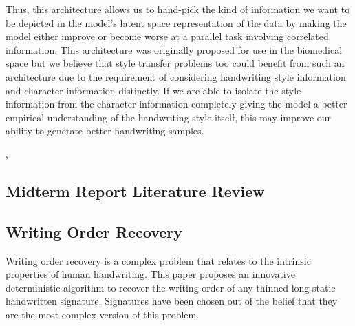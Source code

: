 \documentclass[10pt,twocolumn,letterpaper]{article}
\begin{document}
Thus, this architecture allows us to hand-pick the kind of information we want to be depicted in the model's latent space representation of the data by making the model either improve or become worse at a parallel task involving correlated information. This architecture was originally proposed for use in the biomedical space but we believe that style transfer problems too could benefit from such an architecture due to the requirement of considering handwriting style information and character information distinctly. If we are able to isolate the style information from the character information completely giving the model a better empirical understanding of the handwriting style itself, this may improve our ability to generate better handwriting samples.

,\vspace*{-1em}

\subsection*{Midterm Report Literature Review}
\subsection{Writing Order Recovery\cite{WOR}}
\label{sec:wor_det}
Writing order recovery is a complex problem that relates to the intrinsic properties of human handwriting. This paper \cite{WOR} proposes an innovative deterministic algorithm to recover the writing order of any thinned long static handwritten signature. Signatures have been chosen out of the belief that they are the most complex version of this problem.
\end{document}
